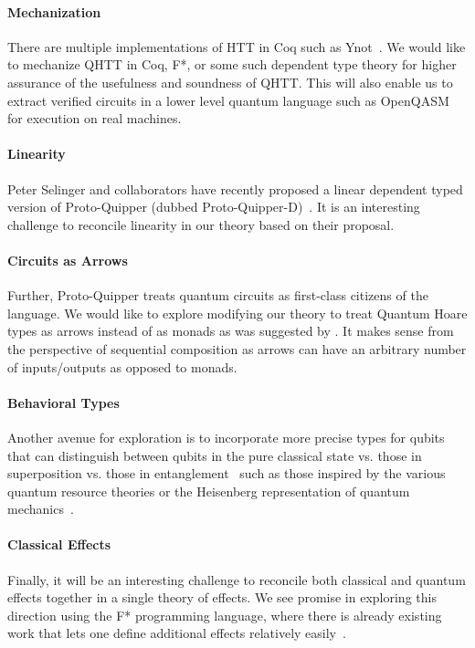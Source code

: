 \documentclass[adraft,creativecommons]{eptcs}
\theoremstyle{definition}
\theoremstyle{remark}
\begin{document}
\paragraph{Mechanization} There are multiple implementations of HTT in Coq such as Ynot~\parencite{ynot2008}. We would like to mechanize QHTT in Coq, F*, or some such dependent type theory for higher assurance of the usefulness and soundness of QHTT. This will also enable us to extract verified circuits in a lower level quantum language such as OpenQASM~\parencite{cross2017} for execution on real machines.

\paragraph{Linearity} Peter Selinger and collaborators have recently proposed a linear dependent typed version of Proto-Quipper (dubbed Proto-Quipper-D)~\parencite{selinger2020,fu2020linear}. It is an interesting challenge to reconcile linearity in our theory based on their proposal.

\paragraph{Circuits as Arrows} Further, Proto-Quipper treats quantum circuits as first-class citizens of the language. We would like to explore modifying our theory to treat Quantum Hoare types as arrows instead of as monads as was suggested by \textcite{so-arrows}. It makes sense from the perspective of sequential composition as arrows can have an arbitrary number of inputs/outputs as opposed to monads.

\paragraph{Behavioral Types} Another avenue for exploration is to incorporate more precise types for qubits that can distinguish between qubits in the pure classical state vs. those in superposition vs. those in entanglement~\parencite{JorrandPerdrix2009} such as those inspired by the various quantum resource theories or the Heisenberg representation of quantum mechanics~\parencite{rssl2019,rssl20}.

\paragraph{Classical Effects} Finally, it will be an interesting challenge to reconcile both classical and quantum effects together in a single theory of effects. We see promise in exploring this direction using the F* programming language, where there is already existing work that lets one define additional effects relatively easily~\parencite{dm4free2017}.
\end{document}
